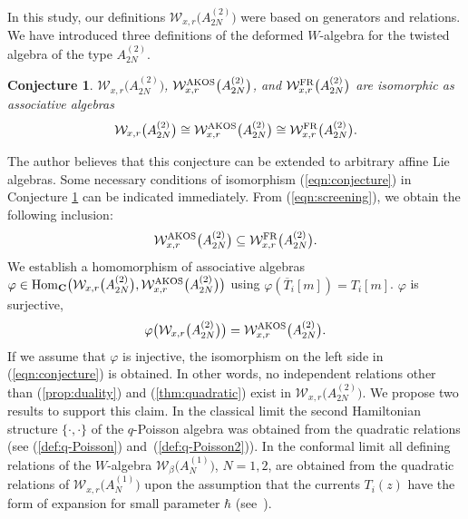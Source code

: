 \documentclass[pdftex]{sigma}
\numberwithin{equation}{section}
\newtheorem{Conjecture}[Theorem]{Conjecture}
 { \theoremstyle{definition}
\newtheorem{Definition}[Theorem]{Definition}
\newtheorem{Example}[Theorem]{Example}
\newtheorem{Remark}[Theorem]{Remark} }
\begin{document}
In this study, our definitions ${\mathcal W}_{x,r}\big(A_{2N}^{(2)}\big)$
were based on generators and relations.
We have introduced three definitions of the deformed $W$-algebra
for the twisted algebra of the type $A_{2N}^{(2)}$.

\begin{Conjecture}
\label{conj:5-1}
${\mathcal W}_{x,r}\big(A_{2N}^{(2)}\big)$,
${\mathcal W}_{x,r}^{\rm AKOS}\big(A_{2N}^{(2)}\big)$, and
${\mathcal W}_{x,r}^{\rm FR}\big(A_{2N}^{(2)}\big)$
are isomorphic as associative algebras
\begin{gather}
{\mathcal W}_{x,r}\big(A_{2N}^{(2)}\big)\cong
{\mathcal W}_{x,r}^{\rm AKOS}\big(A_{2N}^{(2)}\big)\cong
{\mathcal W}_{x,r}^{\rm FR}\big(A_{2N}^{(2)}\big).
\label{eqn:conjecture}
\end{gather}
\end{Conjecture}

The author believes that this conjecture can be extended to
arbitrary affine Lie algebras.
Some necessary conditions of isomorphism (\ref{eqn:conjecture})
in Conjecture \ref{conj:5-1}
can be indicated immediately.
From (\ref{eqn:screening}), we obtain the following inclusion:
\begin{gather*}
{\mathcal W}_{x,r}^{\rm AKOS}\big(A_{2N}^{(2)}\big) \subseteq
{\mathcal W}_{x,r}^{\rm FR}\big(A_{2N}^{(2)}\big).
\end{gather*}
We establish a homomorphism of associative algebras
$\varphi \in {\rm Hom}_{{\bf C}}\big({\mathcal W}_{x,r}\big(A_{2N}^{(2)}\big),
{\mathcal W}_{x,r}^{\rm AKOS}\big(A_{2N}^{(2)}\big)\big)$
using $\varphi(\overline{T}_i[m])=T_i[m]$. $\varphi$ is surjective,
\begin{gather*}
\varphi\big({\mathcal W}_{x,r}\big(A_{2N}^{(2)}\big)\big)
={\mathcal W}_{x,r}^{\rm AKOS}\big(A_{2N}^{(2)}\big).
\end{gather*}
If we assume that $\varphi$ is injective,
the isomorphism on the left side in (\ref{eqn:conjecture}) is obtained.
In other words, no independent relations other than (\ref{prop:duality})
and (\ref{thm:quadratic}) exist
in ${\mathcal W}_{x,r}\big(A_{2N}^{(2)}\big)$.
We propose two results to support this claim.
In the classical limit the second Hamiltonian structure $\{\cdot, \cdot\}$
of the $q$-Poisson algebra
\cite{Frenkel-Reshetikhin2,Frenkel-Reshetikhin1, Frenkel-Reshetikhin-Semenov,
Semenov-Sevostyanov}
was obtained from the quadratic relations
(see (\ref{def:q-Poisson}) and~(\ref{def:q-Poisson2})).
In the conformal limit all defining relations of the $W$-algebra
${\mathcal W}_\beta\big(A_N^{(1)}\big)$, $N=1, 2$,
are obtained from the quadratic relations of
${\mathcal W}_{x, r}\big(A_N^{(1)}\big)$ {upon the assumption
that the currents $T_i(z)$ have the form of expansion
for small parameter $\hbar$}
(see~\cite[Appendix]{Awata-Kubo-Odake-Shiraishi2}).
\end{document}
